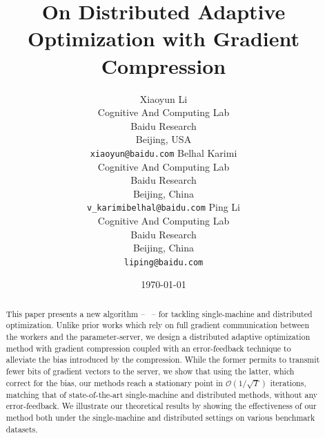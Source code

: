 \documentclass[11pt]{article}
\begin{document}
\title{On Distributed Adaptive Optimization with Gradient Compression}

\author{
Xiaoyun Li \\
  Cognitive And Computing Lab\\
  Baidu Research\\
  Beijing, USA \\
  \texttt{xiaoyun@baidu.com} 
   \And
  Belhal Karimi \\
  Cognitive And Computing Lab\\
  Baidu Research\\
  Beijing, China \\
  \texttt{v_karimibelhal@baidu.com} 
   \And
  Ping Li \\
  Cognitive And Computing Lab\\
  Baidu Research\\
  Beijing, China \\
  \texttt{liping@baidu.com} \\
}

\date{\today}

\maketitle

\begin{abstract}
This paper presents a new algorithm -- \algo\ -- for tackling single-machine and distributed optimization.
Unlike prior works which rely on full gradient communication between the workers and the parameter-server, we design a distributed adaptive optimization method with gradient compression coupled with an error-feedback technique to alleviate the bias introduced by the compression.
While the former permits to transmit fewer bits of gradient vectors to the server, we show that using the latter, which correct for the bias, our methods reach a stationary point in $\mathcal{O}(1/ \sqrt{T})$ iterations, matching that of state-of-the-art single-machine and distributed methods, without any error-feedback.
We illustrate our theoretical results by showing the effectiveness of our method both under the single-machine and distributed settings on various benchmark datasets.
\end{abstract}
\end{document}
